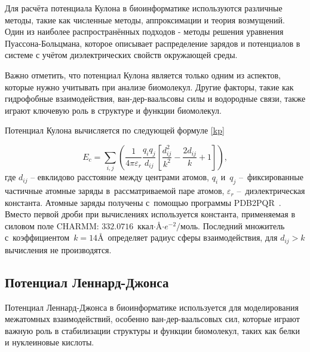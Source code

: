 Для расчёта потенциала Кулона в биоинформатике используются различные методы, такие как численные методы, аппроксимации и теория возмущений. Один из наиболее распространённых подходов - методы решения уравнения Пуассона-Больцмана, которое описывает распределение зарядов и потенциалов в системе с учётом диэлектрических свойств окружающей среды.

Важно отметить, что потенциал Кулона является только одним из аспектов, которые нужно учитывать при анализе биомолекул. Другие факторы, такие как гидрофобные взаимодействия, ван-дер-ваальсовы силы и водородные связи, также играют ключевую роль в структуре и функции биомолекул.

Потенциал Кулона вычисляется по следующей формуле \ref{kp} 

\begin{equation}
	E_{c}=\sum_{i,j}\left({\frac{1}{4 \pi \varepsilon_{r}}} \frac{q_{i}q_{j}}{d_{ij}} \left[ \frac{d^{2}_{ij}}{k^{2}} - \frac{2 d_{ij}}{k} + 1 \right]\right),
	\label{kp}
\end{equation}
где $d_{ij}$ -- евклидово расстояние между центрами атомов, $q_{i}$ и~$q_{j}$ --~фиксированные частичные атомные заряды в~рассматриваемой паре атомов, $\varepsilon_{r}$ --~диэлектрическая константа. Атомные заряды получены с~помощью программы PDB2PQR~\cite{pdb2pqr}. Вместо первой дроби при вычислениях используется константа, применяемая в силовом поле CHARMM: $332.0716$~ккал${\cdot}$\AA${\cdot}e^{-2}/$моль. Последний множитель с~коэффициентом~$k=14$\AA \ определяет радиус сферы взаимодействия, для $d_{ij} > k$ вычисления не производятся.












\subsection{Потенциал Леннард-Джонса}

Потенциал Леннард-Джонса в биоинформатике используется для моделирования межатомных взаимодействий, особенно ван-дер-ваальсовых сил, которые играют важную роль в стабилизации структуры и функции биомолекул, таких как белки и нуклеиновые кислоты.

